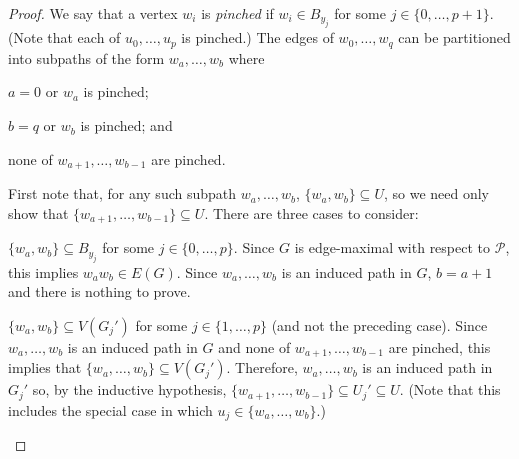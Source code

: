 \documentclass[kpfonts]{patmorin}
\newcommand{\defin}[1]{\emph{\color{brightmaroon}#1}}
\theoremstyle{named}
\begin{document}
\begin{proof}
    We say that a vertex $w_i$ is \defin{pinched} if $w_i\in B_{y_j}$ for some $j\in\{0,\ldots,p+1\}$. (Note that each of $u_0,\ldots,u_p$ is pinched.) The edges of $w_0,\ldots,w_q$ can be partitioned into subpaths of the form $w_{a},\ldots,w_{b}$ where
    \begin{inparaenum}[(i)]
        \item $a=0$ or $w_a$ is pinched;
        \item $b=q$ or $w_b$ is pinched; and
        \item none of $w_{a+1},\ldots,w_{b-1}$ are pinched.
    \end{inparaenum}
    First note that, for any such subpath $w_a,\ldots,w_b$, $\{w_a,w_b\}\subseteq U$, so we need only show that $\{w_{a+1},\ldots,w_{b-1}\}\subseteq U$.  There are three cases to consider:

    \begin{compactenum}
       \item $\{w_a,w_b\}\subseteq B_{y_j}$ for some $j\in\{0,\ldots,p\}$.  Since $G$ is edge-maximal with respect to $\mathcal{P}$, this implies  $w_aw_b\in E(G)$. Since $w_a,\ldots,w_b$ is an induced path in $G$, $b=a+1$ and there is nothing to prove.

       \item $\{w_a,w_b\}\subseteq V(G_j')$ for some $j\in\{1,\ldots,p\}$ (and not the preceding case).
       Since $w_a,\ldots,w_b$ is an induced path in $G$ and none of $w_{a+1},\ldots,w_{b-1}$ are pinched, this implies that $\{w_a,\ldots,w_b\}\subseteq V(G_j')$.  Therefore, $w_a,\ldots,w_b$ is an induced path in $G_j'$ so, by the inductive hypothesis, $\{w_{a+1},\ldots,w_{b-1}\}\subseteq U_j'\subseteq U$.  (Note that this includes the special case in which $u_j\in\{w_a,\ldots,w_b\}$.)


\end{compactenum}
\end{proof}
\end{document}

